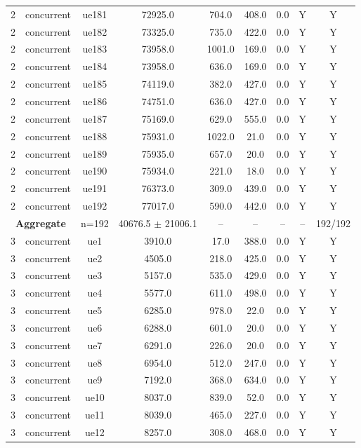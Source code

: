 \begin{table}[ht]
\begin{tabular}{|c|c|c|c|c|c|c|c|c|}
2 & concurrent & ue181 & 72925.0 & 704.0 & 408.0 & 0.0 & Y & Y \\
2 & concurrent & ue182 & 73325.0 & 735.0 & 422.0 & 0.0 & Y & Y \\
2 & concurrent & ue183 & 73958.0 & 1001.0 & 169.0 & 0.0 & Y & Y \\
2 & concurrent & ue184 & 73958.0 & 636.0 & 169.0 & 0.0 & Y & Y \\
2 & concurrent & ue185 & 74119.0 & 382.0 & 427.0 & 0.0 & Y & Y \\
2 & concurrent & ue186 & 74751.0 & 636.0 & 427.0 & 0.0 & Y & Y \\
2 & concurrent & ue187 & 75169.0 & 629.0 & 555.0 & 0.0 & Y & Y \\
2 & concurrent & ue188 & 75931.0 & 1022.0 & 21.0 & 0.0 & Y & Y \\
2 & concurrent & ue189 & 75935.0 & 657.0 & 20.0 & 0.0 & Y & Y \\
2 & concurrent & ue190 & 75934.0 & 221.0 & 18.0 & 0.0 & Y & Y \\
2 & concurrent & ue191 & 76373.0 & 309.0 & 439.0 & 0.0 & Y & Y \\
2 & concurrent & ue192 & 77017.0 & 590.0 & 442.0 & 0.0 & Y & Y \\
\multicolumn{2}{|c|}{\textbf{Aggregate}} & n=192 & 40676.5 $\pm$ 21006.1 & -- & -- & -- & -- & 192/192 \\
\hline
3 & concurrent & ue1 & 3910.0 & 17.0 & 388.0 & 0.0 & Y & Y \\
3 & concurrent & ue2 & 4505.0 & 218.0 & 425.0 & 0.0 & Y & Y \\
3 & concurrent & ue3 & 5157.0 & 535.0 & 429.0 & 0.0 & Y & Y \\
3 & concurrent & ue4 & 5577.0 & 611.0 & 498.0 & 0.0 & Y & Y \\
3 & concurrent & ue5 & 6285.0 & 978.0 & 22.0 & 0.0 & Y & Y \\
3 & concurrent & ue6 & 6288.0 & 601.0 & 20.0 & 0.0 & Y & Y \\
3 & concurrent & ue7 & 6291.0 & 226.0 & 20.0 & 0.0 & Y & Y \\
3 & concurrent & ue8 & 6954.0 & 512.0 & 247.0 & 0.0 & Y & Y \\
3 & concurrent & ue9 & 7192.0 & 368.0 & 634.0 & 0.0 & Y & Y \\
3 & concurrent & ue10 & 8037.0 & 839.0 & 52.0 & 0.0 & Y & Y \\
3 & concurrent & ue11 & 8039.0 & 465.0 & 227.0 & 0.0 & Y & Y \\
3 & concurrent & ue12 & 8257.0 & 308.0 & 468.0 & 0.0 & Y & Y \\

\end{tabular}
\end{table}
